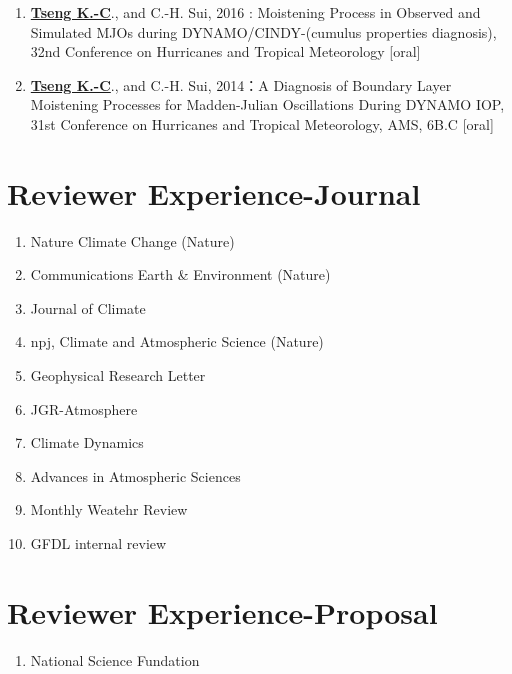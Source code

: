 \documentclass{article}
\begin{document}
\begin{enumerate}
	\item \normalsize{\bf{\underline{Tseng K.-C}}}., and C.-H. Sui, 2016 : Moistening Process in Observed and Simulated MJOs during DYNAMO/CINDY-(cumulus properties diagnosis), 32nd Conference on Hurricanes and Tropical Meteorology [oral] 
	\item \normalsize{\bf{\underline{Tseng K.-C}}}., and C.-H. Sui, 2014：A Diagnosis of Boundary Layer Moistening Processes for Madden-Julian Oscillations During DYNAMO IOP, 31st Conference on Hurricanes and Tropical Meteorology, AMS, 6B.C [oral] 
    \end{enumerate}


\section{\color{airforceblue}Reviewer Experience-Journal}
\begin{enumerate}
	\item Nature Climate Change (Nature)
	\item Communications Earth & Environment (Nature)
	\item Journal of Climate 
	\item npj, Climate and Atmospheric Science (Nature)
	\item Geophysical Research Letter
	\item JGR-Atmosphere
	\item Climate Dynamics
	\item Advances in Atmospheric Sciences
	\item Monthly Weatehr Review
	\item GFDL internal review
\end{enumerate}
\section{\color{airforceblue}Reviewer Experience-Proposal}
\begin{enumerate}
	\item National Science Fundation
\end{enumerate}
\end{document}
